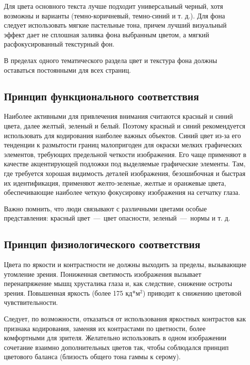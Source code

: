 \documentclass[14pt]{extarticle}
\begin{document}
Для цвета основного текста лучше подходит универсальный черный, хотя возможны и варианты (темно-коричневый, темно-синий и т. д.). Для фона следует использовать мягкие пастельные тона, причем лучший визуальный эффект дает не сплошная заливка фона выбранным цветом, а мягкий расфокусированный текстурный фон.

В пределах одного тематического раздела цвет и текстура фона должны оставаться постоянными для всех страниц.

\subsection{Принцип функционального соответствия}

Наиболее активными для привлечения внимания считаются красный и синий цвета, далее желтый, зеленый и белый. Поэтому красный и синий рекомендуется использовать для кодирования наиболее важных объектов. Синий цвет из-за его тенденции к размытости границ малопригоден для окраски мелких графических элементов, требующих предельной четкости изображения. Его чаще применяют в качестве акцентирующей подложки под выделяемые графические элементы. Там, где требуется хорошая видимость деталей изображения, безошибочная и быстрая их идентификация, применяют желто-зеленые, желтые и оранжевые цвета, обеспечивающие наиболее четкую фокусировку изображения на сетчатку глаза.

Важно помнить, что люди связывают с различными цветами особые представления: красный цвет~---~цвет опасности, зеленый~---~нормы и т. д.

\subsection{Принцип физиологического соответствия}

Цвета по яркости и контрастности не должны выходить за пределы, вызывающие утомление зрения. Пониженная светимость изображения вызывает перенапряжение мышц хрусталика глаза и, как следствие, снижение остроты зрения. Повышенная яркость (более 175 кд*м$^2$) приводит к снижению цветовой чувствительности.

Следует, по возможности, отказаться от использования яркостных контрастов как признака кодирования, заменяя их контрастами по цветности, более комфортными для зрителя. Желательно использовать в одном изображении сочетание взаимно дополнительных цветов так, чтобы соблюдался принцип цветового баланса (близость общего тона гаммы к серому).
\end{document}
